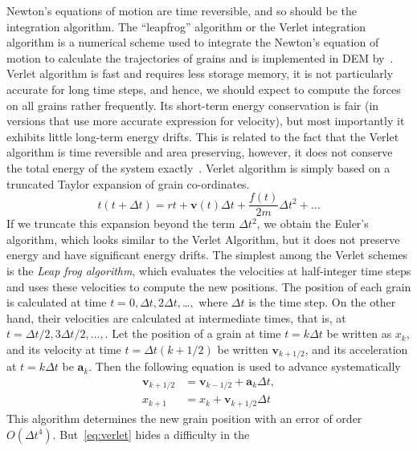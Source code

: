 Newton's equations of motion are time reversible, and so should be the 
integration algorithm. The ``leapfrog'' algorithm or the Verlet integration 
algorithm is a numerical scheme used to integrate the Newton's equation of 
motion to calculate the trajectories of grains and is implemented in 
DEM by~\citet{Verlet1967}. Verlet algorithm is 
fast and requires less storage memory, it is not particularly accurate for long 
time steps, and hence, we should expect to compute the forces on all grains 
rather frequently. Its short-term energy conservation is fair (in versions that 
use more accurate expression for velocity), but most importantly it exhibits 
little long-term energy drifts. This is related to the fact that the Verlet 
algorithm is time reversible and area preserving, however, it does not conserve 
the total energy of the system exactly~\citep{Frenkel1996}. Verlet algorithm is 
simply based on a truncated Taylor expansion of grain co-ordinates. 
%
\begin{equation}
t(t+\Delta t)=r{t} +\mathbf{v}(t) \Delta t + \frac{f(t)}{2\mathit{m}} \Delta 
t^{2}+ \dots
\end{equation}
%
If we truncate this expansion beyond the term $\Delta t^{2}$, we obtain the 
Euler's algorithm, which looks similar to the Verlet Algorithm, but it does not 
preserve energy and have significant energy drifts. The simplest among the 
Verlet schemes is the \textit{Leap frog algorithm}, which evaluates the 
velocities at half-integer time steps and uses these velocities to compute the 
new positions. The position of each grain is calculated at time $t=0, \Delta t, 
2\Delta t, $\dots$ ,$ where $\Delta t$ is the time step. On the other hand, 
their velocities are calculated at intermediate times, that is, at $t=\Delta 
t/2, 3 \Delta t/2, \dots,$. Let the position of a grain at time $t=k\Delta t$ 
be written as $x_{\mathit{k}}$, and its velocity at time $t=\Delta t (k + 
1/2)$ be written $\mathbf{v}_{\mathit{k + 1/2}}$, and its acceleration at $t=k 
\Delta t$ be $\mathbf{a}_{\mathit{k}}$. Then the following equation is used to 
advance systematically
%
\begin{align}\label{eq:verlet}
\mathbf{v}_{\mathit{k}+1/2} & 
=\mathbf{v}_{\mathit{k}-1/2}+\mathbf{a}_{\mathit{k}}
 \Delta t, \\
x_{\mathit{k}+1} & =x_{\mathit{k}}+\mathbf{v}_{\mathit{k}+1/2} \Delta t
\end{align}
%
This algorithm determines the new grain position with an error of order 
$\mathit{O}( \Delta t^{4})$. But~\cref{eq:verlet} hides a difficulty in the 
